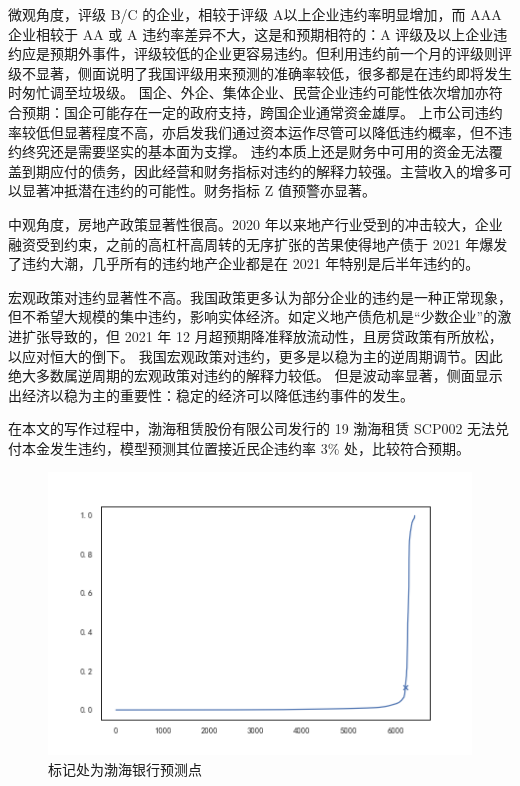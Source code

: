 
微观角度，评级 B/C 的企业，相较于评级 A以上企业违约率明显增加，而 AAA 企业相较于 AA 或 A 违约率差异不大，这是和预期相符的：A 评级及以上企业违约应是预期外事件，评级较低的企业更容易违约。但利用违约前一个月的评级则评级不显著，侧面说明了我国评级用来预测的准确率较低，很多都是在违约即将发生时匆忙调至垃圾级。
国企、外企、集体企业、民营企业违约可能性依次增加亦符合预期：国企可能存在一定的政府支持\autocite{mo2021china}，跨国企业通常资金雄厚。
上市公司违约率较低但显著程度不高，亦启发我们通过资本运作尽管可以降低违约概率，但不违约终究还是需要坚实的基本面为支撑。
违约本质上还是财务中可用的资金无法覆盖到期应付的债务，因此经营和财务指标对违约的解释力较强。主营收入的增多可以显著冲抵潜在违约的可能性。财务指标 Z 值预警亦显著。

中观角度，房地产政策显著性很高。2020 年以来地产行业受到的冲击较大，企业融资受到约束，之前的高杠杆高周转的无序扩张的苦果使得地产债于 2021 年爆发了违约大潮，几乎所有的违约地产企业都是在 2021 年特别是后半年违约的。

宏观政策对违约显著性不高。我国政策更多认为部分企业的违约是一种正常现象，但不希望大规模的集中违约，影响实体经济。如定义地产债危机是“少数企业”的激进扩张导致的，但 2021 年 12 月超预期降准释放流动性，且房贷政策有所放松，以应对恒大的倒下。
我国宏观政策对违约，更多是以稳为主的逆周期调节。因此绝大多数属逆周期的宏观政策对违约的解释力较低。
但是波动率显著，侧面显示出经济以稳为主的重要性：稳定的经济可以降低违约事件的发生。

在本文的写作过程中，渤海租赁股份有限公司发行的 19 渤海租赁 SCP002 无法兑付本金发生违约，模型预测其位置接近民企违约率 3\% 处，比较符合预期。
\begin{figure}[h]
	\centering
	\includegraphics[width=0.9\linewidth]{./data/渤海银行.png}
	\caption{标记处为渤海银行预测点}
	\label{fig:bhyh}
\end{figure}

